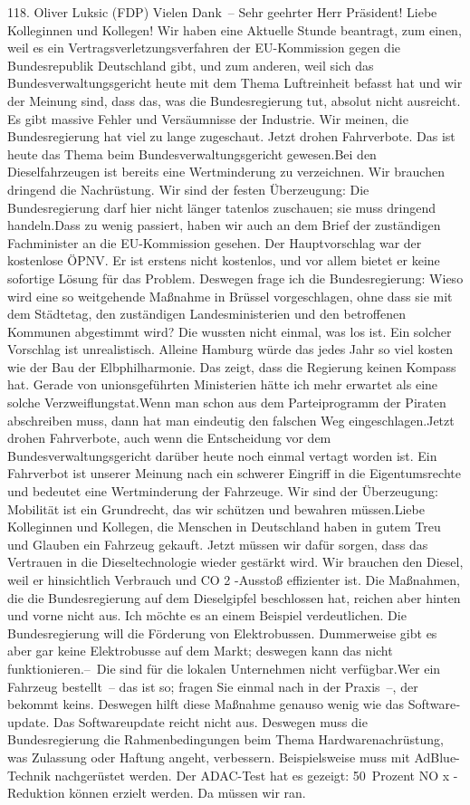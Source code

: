 \documentclass{article}
\begin{document}
	118. Oliver Luksic (FDP) Vielen Dank – Sehr geehrter Herr Präsident! Liebe Kolleginnen und Kollegen! Wir haben eine Aktuelle Stunde beantragt, zum einen, weil es ein Vertragsverletzungsverfahren der EU-Kommission gegen die Bundesrepublik Deutschland gibt, und zum anderen, weil sich das Bundesverwaltungsgericht heute mit dem Thema Luftreinheit befasst hat und wir der Meinung sind, dass das, was die Bundesregierung tut, absolut nicht ausreicht. Es gibt massive Fehler und Versäumnisse der Industrie. Wir meinen, die Bundesregierung hat viel zu lange zugeschaut. Jetzt drohen Fahrverbote. Das ist heute das Thema beim Bundesverwaltungsgericht gewesen.Bei den Dieselfahrzeugen ist bereits eine Wertminderung zu verzeichnen. Wir brauchen dringend die Nachrüstung. Wir sind der festen Überzeugung: Die Bundesregierung darf hier nicht länger tatenlos zuschauen; sie muss dringend handeln.Dass zu wenig passiert, haben wir auch an dem Brief der zuständigen Fachminister an die EU-Kommission gesehen. Der Hauptvorschlag war der kostenlose ÖPNV. Er ist erstens nicht kostenlos, und vor allem bietet er keine sofortige Lösung für das Problem. Deswegen frage ich die Bundesregierung: Wieso wird eine so weitgehende Maßnahme in Brüssel vorgeschlagen, ohne dass sie mit dem Städtetag, den zuständigen Landesministerien und den betroffenen Kommunen abgestimmt wird? Die wussten nicht einmal, was los ist. Ein solcher Vorschlag ist unrealistisch. Alleine Hamburg würde das jedes Jahr so viel kosten wie der Bau der Elbphilharmonie. Das zeigt, dass die Regierung keinen Kompass hat. Gerade von unionsgeführten Ministerien hätte ich mehr erwartet als eine solche Verzweiflungstat.Wenn man schon aus dem Parteiprogramm der Piraten abschreiben muss, dann hat man eindeutig den falschen Weg eingeschlagen.Jetzt drohen Fahrverbote, auch wenn die Entscheidung vor dem Bundesverwaltungsgericht darüber heute noch einmal vertagt worden ist. Ein Fahrverbot ist unserer Meinung nach ein schwerer Eingriff in die Eigentumsrechte und bedeutet eine Wertminderung der Fahrzeuge. Wir sind der Überzeugung: Mobilität ist ein Grundrecht, das wir schützen und bewahren müssen.Liebe Kolleginnen und Kollegen, die Menschen in Deutschland haben in gutem Treu und Glauben ein Fahrzeug gekauft. Jetzt müssen wir dafür sorgen, dass das Vertrauen in die Dieseltechnologie wieder gestärkt wird. Wir brauchen den Diesel, weil er hinsichtlich Verbrauch und CO 2 -Ausstoß effizienter ist. Die Maßnahmen, die die Bundesregierung auf dem Dieselgipfel beschlossen hat, reichen aber hinten und vorne nicht aus. Ich möchte es an einem Beispiel verdeutlichen. Die Bundesregierung will die Förderung von Elektrobussen. Dummerweise gibt es aber gar keine Elektrobusse auf dem Markt; deswegen kann das nicht funktionieren.– Die sind für die lokalen Unternehmen nicht verfügbar.Wer ein Fahrzeug bestellt – das ist so; fragen Sie einmal nach in der Praxis –, der bekommt keins. Deswegen hilft diese Maßnahme genauso wenig wie das Software­update. Das Softwareupdate reicht nicht aus. Deswegen muss die Bundesregierung die Rahmenbedingungen beim Thema Hardwarenachrüstung, was Zulassung oder Haftung angeht, verbessern. Beispielsweise muss mit AdBlue-Technik nachgerüstet werden. Der ADAC-Test hat es gezeigt: 50 Prozent NO x -Reduktion können erzielt werden. Da müssen wir ran. 
\end{document}
